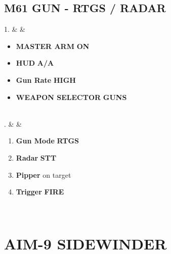 \documentclass[fontInter]{TechCheck}
\begin{document}
	\subsection{M61 GUN - RTGS / RADAR}
	\begin{listtabular}
		1. &  &
		\begin{minipage}[t]{\linewidth}
			\vspace{-7pt}
			\begin{itemize}
				\item \textbf{MASTER ARM} \dotfill \textbf{ON}
				\item \textbf{HUD} \dotfill \textbf{A/A}
				\item \textbf{Gun Rate} \dotfill \textbf{HIGH}
				\item \textbf{WEAPON SELECTOR} \dotfill \textbf{GUNS}
			\end{itemize}
		\end{minipage} \\
		. &  &
		\begin{minipage}[t]{\linewidth}
			\vspace{-7pt}
			\begin{enumerate}
				\item \textbf{Gun Mode} \dotfill \textbf{RTGS}
				\item \textbf{Radar} \dotfill \textbf{STT}
				\item \textbf{Pipper} \dotfill on target
				\item \textbf{Trigger} \dotfill \textbf{FIRE}
			\end{enumerate}
		\end{minipage} \\
	\end{listtabular}

	\clearpage
	\section{AIM-9 SIDEWINDER}
\end{document}
